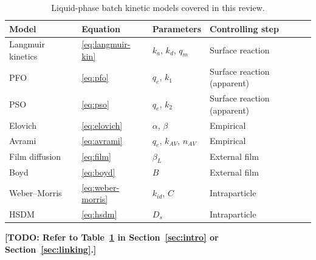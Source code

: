 \documentclass[11pt,a4paper]{article}
\newcommand{\todo}[1]{\textbf{[TODO: #1]}}
\begin{document}
\begin{table}[ht]
  \centering
  \caption{Liquid-phase batch kinetic models covered in this review.}
  \label{tab:summary}
  \begin{tabular}{@{}llll@{}}
    \toprule
    Model & Equation & Parameters & Controlling step \\
    \midrule
    Langmuir kinetics & \eqref{eq:langmuir-kin} & $k_a$, $k_d$, $q_m$
      & Surface reaction \\
    PFO & \eqref{eq:pfo} & $q_e$, $k_1$ & Surface reaction (apparent) \\
    PSO & \eqref{eq:pso} & $q_e$, $k_2$ & Surface reaction (apparent) \\
    Elovich & \eqref{eq:elovich} & $\alpha$, $\beta$ & Empirical \\
    Avrami & \eqref{eq:avrami} & $q_e$, $k_{AV}$, $n_{AV}$ & Empirical \\
    Film diffusion & \eqref{eq:film} & $\beta_L$ & External film \\
    Boyd & \eqref{eq:boyd} & $B$ & External film \\
    Weber--Morris & \eqref{eq:weber-morris} & $k_{id}$, $C$
      & Intraparticle \\
    HSDM & \eqref{eq:hsdm} & $D_s$ & Intraparticle \\
    \bottomrule
  \end{tabular}
\end{table}

\todo{Refer to Table~\ref{tab:summary} in Section~\ref{sec:intro} or
Section~\ref{sec:linking}.}

\printbibliography
\end{document}
